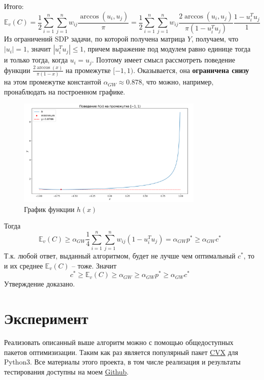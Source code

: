 \documentclass[12pt, a4paper]{article}
\newcommand{\Expect}{\mathbb{E}}
\begin{document}
Итого:
$$ \Expect_v (C) = \frac{1}{2} \sum_{i = 1}^{n} \sum_{j=1}^{n} w_{ij} \frac{\arccos(u_i, u_j)}{\pi} = \frac{1}{2} \sum_{i = 1}^{n} \sum_{j=1}^{n} w_{ij} \frac{2\arccos(u_i, u_j)}{\pi(1 - u_i^T u_j)} \frac{1 - u_i^T u_j}{1} $$
Из ограничений SDP задачи, по которой получена матрица $Y$, получаем, что $|u_i| = 1$, значит $|u_i^T u_j| \leqslant 1$, причем выражение под модулем равно единице тогда и только тогда, когда $u_i = u_j$. Поэтому имеет смысл рассмотреть поведение функции $\frac{2 \arccos (x)}{\pi (1 - x)}$ на промежутке $[-1, 1)$. Оказывается, она \textbf{ограничена снизу} на этом промежутке константой $\alpha_{GW} \approx 0.878$, что можно, например, пронаблюдать на построенном графике.

\begin{figure}[h]
\centering
\includegraphics[width=0.8\textwidth]{images/h.png}
\caption[width=0.8\textwidth]{График функции $h(x)$}
\label{fig:fig3}
\end{figure}

Тогда
$$ \Expect_v (C) \geqslant \alpha_{GW} \frac{1}{4} \sum_{i = 1}^{n} \sum_{j=1}^{n} w_{ij} (1 - u_i^T u_j) = \alpha_{GW} p^* \geqslant \alpha_{GW} c^*$$
Т.к. любой ответ, выданный алгоритмом, будет не лучше чем оптимальный $c^*$, то и их среднее $\Expect_v (C)$ -- тоже. Значит
$$c^* \geqslant \Expect_v (C) \geqslant \alpha_{GW} \geqslant \alpha_{GW} p^* \geqslant \alpha_{GW} c^*$$
Утверждение доказано.\\
\null \hfill \square

\section{Эксперимент}

Реализовать описанный выше алгоритм можно с помощью общедоступных пакетов оптимизизации. Таким как раз является популярный пакет \href{https://cvxopt.org}{CVX} для Python3. Все материалы этого проекта, в том числе реализация и результаты тестирования доступны на моем \href{https://github.com/rvg77/max-cut}{Github}.
\end{document}
